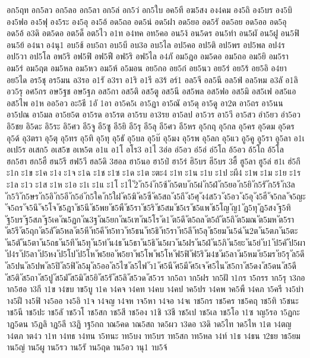 {อก5ฤท
อก5ลว
อก5ลอ
อก5ลา
อก5ล่
อก5ว่
อก5ใบ
อค5ที
อฆ5สง
อง4คม
อง5ถิ
อง5บร
อง5บิ
อง5ฟอ
อง5ฟุ
อง5ระ
อง5อุ
อง5อ้
อด5ถอ
อด5น่
อด5ฝา
อด5ยอ
อด5รั
อด5อย
อด5ออ
อด5อุ
อด5อ้
อ3ดิ
อต5ดอ
อต5ด็
อต5ไว
อ1ท
อ4ทค
อท5คอ
อน5ง้
อน5ดร
อน5ทำ
อน5ผั
อน5ฝู
อน5ฟิ
อน5ย้
อ4นา
อ4นุ1
อบ5ช้
อบ5ถา
อบ5บี
อบ3อ
อบ5ไล
อป5คอ
อป5ติ
อป5พร
อป5พล
อป4ร
อป5วา
อป5โล
อพ5ริ
อฟ5ฟิ
อฟ5ฟี
อฟ5ริ
อฟ5ไล
อ4ภั
อม5ฎอ
อม5ดอ
อม5ถอ
อม5ยิ
อม5รา
อม5ร่
อม5ฤต
อม5หล
อม5หว
อม5ห้
อ5มอน
อย5กอ
อย5ก๋
อย5นว
อย5ร่
อย5ร้
อย5อิ
อ4ยา
อย5ได
อร5ชุ
อร5มน
อ3รอ
อ1รั
อ3รา
อ1ริ
อ1รี
อ3ร้
อร์1
อล5จี
อล5นี
อล5ฟ่
อล5หม
อ3ลั
อ1ลิ
อว5รุ
อศ5กร
อษ5ฐช
อษ5ฐภ
อส5กา
อส5ติ
อส5ตู
อส5นี
อส5พล
อส5ฟอ
อส5มิ
อส5เฟ
อส5แอ
อส5ไพ
อ1ห
ออ5อว
อะ5ธี
1อั
1อา
อา5ค5เ
อา5ฏา
อา5ณั
อา5ดุ
อา5ดู
อา2ต
อา5ถร
อา5นน
อา5ปณ
อา5มล
อา5ย5ต
อา5รด
อา5รต
อา5รบ
อา3รย
อา5ลป
อา5วร
อา5วี
อา5สว
อำ5ยว
อำ5อว
อิ5ชย
อิ5ดะ
อิ5ระ
อิ5ศว
อี5จู
อี5ซู
อี5ยิ
อี5รุ
อี5ลุ
อี5ศว
อี5หร
อุ5กฤ
อุ5กล
อุ5คร
อุ5ดม
อุ5ดร
อุ5ด้
อุ3ตรา
อุ5ตุ
อุ5ทร
อุ5ทิ
อุ5ทุ
อุ5ธั
อุ5บล
อุ5บ๊
อุ5มง
อุ5รพ
อุ5ลก
อุ5แว
อู5คู
อู5รา
อู5ลา
อ1เ
อเป5ร
อเสก5
อเส5ข
อเห5ต
อ1แ
อ1โ
อโร3
อ1ไ
3อ่อ
อ่5อว
อ่5อ่
อ่5โถ
อ้5อว
อ้5โถ
อ้5โล
ฮก5ฮา
ฮก5ฮื
ฮน5รี
ฮฟ5วี
ฮล5ดิ
3ฮอล
ฮา5นอ
ฮา5ป่
ฮา5ร่
ฮิ5บร
ฮี5บร
3ฮื้
ฮู5ลา
ฮู5ล่
ฮ1เ
ฮ่5กึ
ะ1ก
ะ1ข
ะ1ค
ะ1ง
ะ1จ
ะ1ฉ
ะ1ช
ะ1ซ
ะ1ด
ะ1ต
ะตะ4
ะ1ท
ะ1น
ะ1บ
ะ1ป
ะผี4
ะ1พ
ะ1ม
ะ1ย
ะ1ร
ะ1ล
ะ1ว
ะ1ส
ะ1ห
ะ1อ
ะ1เ
ะ1แ
ะ1โ
ะ1ไ
ั2
ัก5ง่
ัก5ซ้
ัก5ตบ
ัก5ผ่
ัก5ฝ่
ัก5ยอ
ัก5ยิ
ัก5รั
ัก5ร้
ัก3ล
ัก5วิ
ัก5ษร
ัก5อิ
ัก5อี
ัก5อ่
ัก5ใค
ัก5ใฝ
ัค5ฆิ
ัค5ซี
ัค5สถ
ัง5ถึ
ัง5ศุ
ัง4ส5ว
ัง5อว
ัง5อุ
ัง5ฮี
ัจ5กล
ัจ5ญะ
ัจ5ถร
ัจ5นึ
ัจ5โจ
ัช5ฎา
ัช5นี
ัช5พย
ัช5พื
ัช5รา
ัช5ริ
ัช5สม
ัช5เร
ัช5แพ
ัช5โญ
ัญ1
ัฏ5ทุ
ัฏ5สง
ัฐ5ทิ
ัฐ5บร
ัฐ5สภ
ัฐ5เค
ัณ5ฏก
ัณ3ฐ
ัณ5ยก
ัณ5เฑ
ัณ5โร
ัด1
ัต5ดึ
ัต5ถล
ัต5ถั
ัต5ถิ
ัต5มณ
ัต5มห
ัต5รา
ัต5รี
ัต5ฤก
ัต5ลั
ัต5หล
ัต5หี
ัท5คี
ัท5ทว
ัท5ธน
ัท5ธิ
ัท5รา
ัท5ลี
ัท5ลุ
ัธ5ยม
ัน5ฉ่
ัน2ต
ัน5ตภ
ัน5ตะ
ัน5ตั
ัน5ตา
ัน5ถธ
ัน5ทึ
ัน5ทุ
ัน5ท่
ัน4ธ
ัน5ธา
ัน5ธิ
ัน5ผว
ัน5ฝร
ัน5ฝ่
ัน5ภิ
ัน5ยะ
ัน5ย่
ับ1
ัป5คั
ัป5ผา
ัป4ร
ัป5ลา
ัป5หง
ัป5โป
ัป5โห
ัพ5ยอ
ัพ5ยา
ัพ5โพ
ัพ5โห
ัฟ5ฟิ
ัฟ5ริ
ัม4ช
ัม5ลา
ัม5หม
ัย5มร
ัย5รุ
ัล5ดี
ัล5ปน
ัล5ปพ
ัล5ปิ
ัล5ฟิ
ัล5มุ
ัล5ออ
ัล5ไซ
ัล5ไฟ
ัว1
ัศ5นี
ัศ5มี
ัศ5เจ
ัศ5ไน
ัส5กา
ัส5ดง
ัส5ดน
ัส5ดี
ัส5ติ
ัส5ถา
ัส5ปู
ัส5มั
ัส5มิ
ัส5ยิ
ัส5รั
ัส5ลิ
ัส5วด
ัส5วร
าก5ถา
าก5ฝร
าก5ฝั
า1กร
า5กรร
าก5รุ
า3กอ
าก5ฮอ
า3กี
า1ข
า4ขบ
าข5บู
า1ค
า4คจ
า4คท
า4คบ
า4คป
าค5ปร
า4คพ
าค5พื
า4คภ
า5ครี
าง5บำ
าง5ฝี
าง5ฟิ
าง5ออ
าง5อิ
า1จ
า4จญ
า4จห
าจ5หา
า4จอ
า4จเ
าช5กร
าช5คร
าช5คฤ
าช5ทิ
า5ชนะ
าช5นี
าช5ปะ
าช5ลั
าช5วโ
าช5สก
าช5สี
าช5อง
า1ชิ
า3ชี
าช5เป
าช5เล
าช5โอ
า1ซ
าญ5รอ
า5ฏกะ
าฏ5ดน
า5ฏลิ
าฏ5ลี
า3ฏิ
าฐ5กถ
าณ5คด
าณ5สถ
าด5ผว
า3ดอ
า3ดิ
าด5ไท
าด5ไห
า1ต
า4ตญ
า4ตภ
าต4ว
า1ท
า4ทธ
า4ทน
า5ทนะ
าท5บง
าท5บร
าท5สก
าท5หล
า4ท์
า1ธ
า4ธน
า2ธย
าธ5ยม
าน5ญ่
าน5ผู
าน5รว
าน5รั
าน5ฤด
าน5อว
านุ1
าบ5จ้
}

